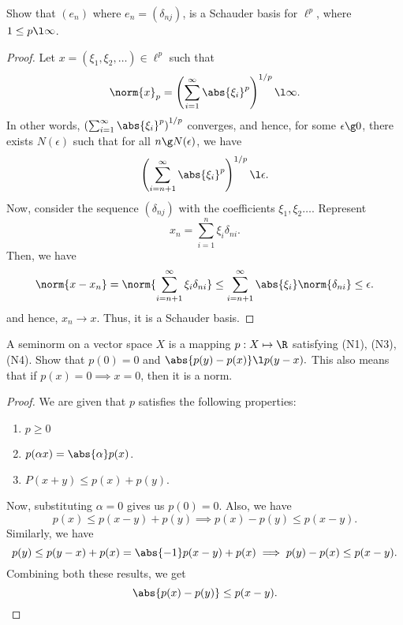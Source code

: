 \begin{question}
    Show that $(e_n)$ where $e_n = (\delta_{nj})$, is a Schauder basis for $\ell^p$, where $1 \leq p \l \infty$.
    \label{section2.3-11}
\end{question}
\begin{proof}
    Let $x = (\xi_1 , \xi_2 , \ldots) \in \ell^p$ such that 
    \[\norm{x}_p = \left(\sum_{i=1}^\infty \abs{\xi_i}^p \right)^{1/p} \l \infty.\]
    In other words, $\left(\sum_{i=1}^\infty \abs{\xi_i}^p \right)^{1/p}$ converges, and hence, for some $\epsilon \g 0$, there exists $N(\epsilon)$ such that for all $n \g N(\epsilon)$, we have
    \[\left(\sum_{i=n+1}^\infty \abs{\xi_i}^p \right)^{1/p} \l \epsilon.\]
    Now, consider the sequence $(\delta_{nj})$ with the coefficients $\xi_1 , \xi_2 \ldots$. Represent
    \[x_n = \sum_{i=1}^n \xi_i \delta_{ni}.\]
    Then, we have
    \[\norm{x - x_n} = \norm{\sum_{i = n+1}^\infty \xi_i \delta_{ni}} \leq \sum_{i=n+1}^\infty \abs{\xi_i} \norm{\delta_{ni}} \leq \epsilon.\]
    and hence, $x_n \rightarrow x$. Thus, it is a Schauder basis.
\end{proof}

\begin{question}
    A seminorm on a vector space $X$ is a mapping $p : X \mapsto \R$ satisfying (N1), (N3), (N4). Show that $p(0) = 0$ and $\abs{p(y) - p(x)} \l p(y-x).$ This also means that if $p(x) = 0 \implies x = 0$, then it is a norm.
    \label{section2.3-12}
\end{question}
\begin{proof}
    We are given that $p$ satisfies the following properties:
    \begin{enumerate}
        \item $p \geq 0$
        \item $p(\alpha x) = \abs{\alpha}p(x)$.
        \item $P(x + y) \leq p(x) + p(y).$
    \end{enumerate}
    Now, substituting $\alpha = 0$ gives us $p(0) = 0$. Also, we have
        \[p(x) \leq p(x-y) + p(y) \implies p(x) - p(y) \leq p(x-y).\]
        Similarly, we have
        \[p(y) \leq p(y-x) + p(x) = \abs{-1}p(x-y) + p(x) \implies p(y) - p(x) \leq p(x-y).\]
        Combining both these results, we get
        \[\abs{p(x) - p(y)} \leq p(x-y).\]
\end{proof}

